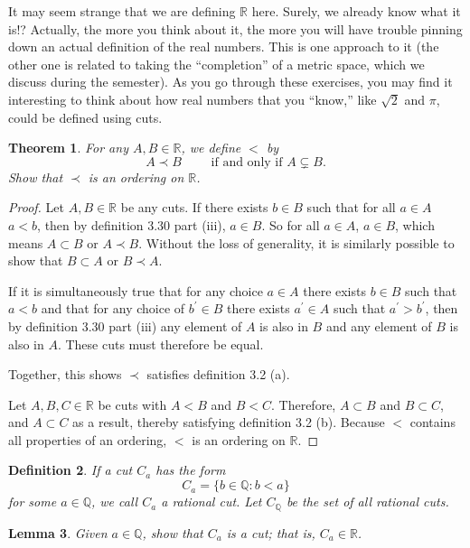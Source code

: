 \documentclass{amsart}
\newtheorem{theorem}{Theorem}
\newtheorem{lemma}[theorem]{Lemma}
\newtheorem{definition}[theorem]{Definition}
\newcommand{\Q}{\mathbb Q}
\newcommand{\R}{\mathbb R}
\newcommand{\1}{\mathds{1}}
\def \R {{\mathbb {R}}}
\numberwithin{equation}{section}
\numberwithin{theorem}{section}
\begin{document}
It may seem strange that we are defining $\R$ here.  Surely, we already know what it is!?  Actually, the more you think about it, the more you will have trouble pinning down an actual definition of the real numbers.  This is one approach to it (the other one is related to taking the ``completion'' of a metric space, which we discuss during the semester).  As you go through these exercises, you may find it interesting to think about how real numbers that you ``know,'' like $\sqrt 2$ and $\pi$, could be defined using cuts.


\begin{theorem}
	For any $A, B\in \R$, we define $<$ by
	\[
	A \prec B
	\qquad\text{ if and only if }
	A \subsetneq B.
	\]
	Show that $\prec$ is an ordering on $\R$.
\end{theorem}

\begin{proof}
	Let $A,B \in\R$ be any cuts. If there exists $b\in B$ such that for all $a\in A$ $a<b$, then by definition 3.30 part (iii), $a\in B$. So for all $a\in A$, $a\in B$, which means $A\subset B$ or $A\prec B$. Without the loss of generality, it is similarly possible to show that $B\subset A$ or $B\prec A$. 
	
	If it is simultaneously true that for any choice $a\in A$ there exists $b\in B$ such that $a<b$ and that for any choice of $b^\prime\in B$ there exists $a^\prime\in A$ such that $a^\prime>b^\prime$, then by definition 3.30 part (iii) any element of $A$ is also in $B$ and any element of $B$ is also in $A$. These cuts must therefore be equal.
	
	Together, this shows $\prec $ satisfies definition 3.2 (a). 
	
	Let $A,B,C\in\R$ be cuts with $A<B$ and $B<C$. Therefore, $A\subset B$ and $B\subset C$, and $A\subset C$ as a result, thereby satisfying definition 3.2 (b). Because $<$ contains all properties of an ordering, $<$ is an ordering on $\R$.
\end{proof}

\begin{definition}
	If a cut $C_a$ has the form
	\[
	C_a = \{b \in \Q: b < a\}
	\]
	for some $a\in \Q$, we call $C_a$ a {\em rational cut}.  Let $C_\Q$ be the set of all rational cuts.
\end{definition}



\begin{lemma}
	Given $a\in \Q$, show that $C_a$ is a cut; that is, $C_a \in \R$.
\end{lemma}
\end{document}
